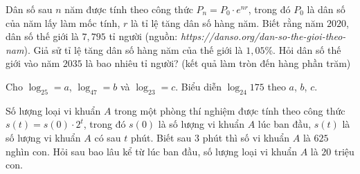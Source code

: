 \begin{ex}%
Dân số sau $n$ năm được tính theo công thức $P_n=P_0 \cdot e^{nr}$, trong đó $P_0$ là dân số của năm lấy làm mốc tính, $r$ là tỉ lệ tăng dân số hàng năm. Biết rằng năm $2020$, dân số thế giới là $7{,}795$ tỉ người (nguồn: \textit{https://danso.org/dan-so-the-gioi-theo-nam}). Giả sử tỉ lệ tăng dân số hàng năm của thế giới là $1{,}05\%$. Hỏi dân số thế giới vào năm $2035$ là bao nhiêu tỉ người? (kết quả làm tròn đến hàng phần trăm)
\end{ex}



\TL
\begin{ex}%
Cho  $\log_25=a$,  $\log_47=b$  và  $\log_23=c$. Biểu diễn $\log_{24}175$ theo $a$, $b$, $c$.
\end{ex}

\begin{ex}%
	Số lượng loại vi khuẩn $A$ trong một phòng thí nghiệm được tính theo công thức $s(t)=s(0)\cdot 2^t$, trong đó $s(0)$ là số lượng vi khuẩn $A$ lúc ban đầu, $s(t)$ là số lượng vi khuẩn $A$ có sau $t$ phút. Biết sau $3$ phút thì số vi khuẩn $A$ là $625$ nghìn con. Hỏi sau bao lâu kể từ lúc ban đầu, số lượng loại vi khuẩn $A$ là $20$ triệu con.
	\end{ex}

